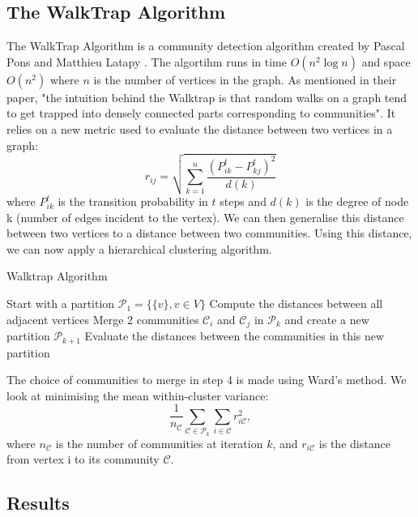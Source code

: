 \documentclass[twoside]{article}
\begin{document}
\begin{multicols}{2}
\subsection{The WalkTrap Algorithm}
The WalkTrap Algorithm is a community detection algorithm created by Pascal Pons and Matthieu Latapy \cite{Gr}. The algortihm runs in time $O(n^2\log n)$ and space $O(n^2)$ where $n$ is the number of vertices in the graph. As mentioned in their paper, "the intuition behind the Walktrap is that random walks on a graph tend to get trapped into densely connected parts corresponding to communities".\cite{Gr} It relies on a new metric used to evaluate the distance between two vertices in a graph:
 $$r_{ij} = \sqrt{\sum\limits_{k=1}^{n}\frac{(P^t_{ik}-P^t_{kj})^2}{d(k)}}$$
 where $P^t_{ik}$ is the transition probability in $t$ steps and $d(k)$ is the degree of node k (number of edges incident to the vertex). We can then generalise this distance between two vertices to a distance between two communities. Using this distance, we can now apply a hierarchical clustering algorithm.

\begin{algorithm}[H]
\caption{Walktrap Algorithm}\label{euclid}
\begin{algorithmic}[1]
\State Start with a partition $\mathcal{P}_1=\{\{v\}, v \in V\}$
\State Compute the distances between all adjacent vertices
\State Merge 2 communities $\mathcal{C}_i$ and $\mathcal{C}_j$ in $\mathcal{P}_k$ and create a new partition $\mathcal{P}_{k+1}$
\State Evaluate the distances between the communities in this new partition
\EndWhile
\end{algorithmic}
\end{algorithm}

\noindent The choice of communities to merge in step 4 is made using Ward's method. We look at minimising the mean within-cluster variance:
$$\frac{1}{n_\mathcal{C}}\sum\limits_{\mathcal{C}\in\mathcal{P}_{k}}\sum\limits_{i\in\mathcal{C}}r^2_{i\mathcal{C}},$$
\noindent where $n_\mathcal{C}$ is the number of communities at iteration $k$, and $r_{i\mathcal{C}}$ is the distance from vertex i to its community $\mathcal{C}$.\\

\subsection{Results}


\end{multicols}
\end{document}
